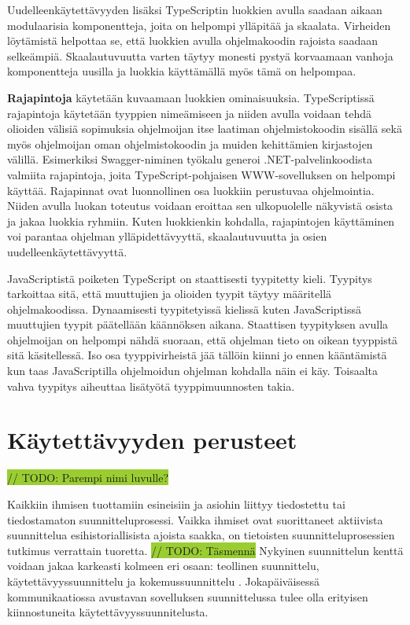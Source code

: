 \documentclass[utf8]{gradu3}
\begin{document}
Uudelleenkäytettävyyden lisäksi TypeScriptin luokkien avulla saadaan aikaan modulaarisia komponentteja, joita on helpompi ylläpitää ja skaalata. Virheiden löytämistä helpottaa se, että luokkien avulla ohjelmakoodin rajoista saadaan selkeämpiä. Skaalautuvuutta varten täytyy monesti pystyä korvaamaan vanhoja komponentteja uusilla ja luokkia käyttämällä myös tämä on helpompaa.

\textbf{Rajapintoja} käytetään kuvaamaan luokkien ominaisuuksia. TypeScriptissä rajapintoja käytetään tyyppien nimeämiseen ja niiden avulla voidaan tehdä olioiden välisiä sopimuksia ohjelmoijan itse laatiman ohjelmistokoodin sisällä sekä myös ohjelmoijan oman ohjelmistokoodin ja muiden kehittämien kirjastojen välillä. \parencite[]{typescript-interfaces} Esimerkiksi Swagger-niminen työkalu generoi .NET-palvelinkoodista valmiita rajapintoja, joita TypeScript-pohjaisen WWW-sovelluksen on helpompi käyttää. Rajapinnat ovat luonnollinen osa luokkiin perustuvaa ohjelmointia. Niiden avulla luokan toteutus voidaan eroittaa sen ulkopuolelle näkyvistä osista ja jakaa luokkia ryhmiin. Kuten luokkienkin kohdalla, rajapintojen käyttäminen voi parantaa ohjelman ylläpidettävyyttä, skaalautuvuutta ja osien uudelleenkäytettävyyttä.

JavaScriptistä poiketen TypeScript on staattisesti tyypitetty kieli. Tyypitys tarkoittaa sitä, että muuttujien ja olioiden tyypit täytyy määritellä ohjelmakoodissa. Dynaamisesti tyypitetyissä kielissä kuten JavaScriptissä muuttujien tyypit päätellään käännöksen aikana. Staattisen tyypityksen avulla ohjelmoijan on helpompi nähdä suoraan, että ohjelman tieto on oikean tyyppistä sitä käsitellessä. Iso osa tyyppivirheistä jää tällöin kiinni jo ennen kääntämistä kun taas JavaScriptilla ohjelmoidun ohjelman kohdalla näin ei käy. Toisaalta vahva tyypitys aiheuttaa lisätyötä tyyppimuunnosten takia.

\section{Käytettävyyden perusteet}
\colorbox{YellowGreen}{// TODO: Parempi nimi luvulle?}

Kaikkiin ihmisen tuottamiin esineisiin ja asiohin liittyy tiedostettu tai tiedostamaton suunnitteluprosessi. Vaikka ihmiset ovat suorittaneet aktiivista suunnittelua esihistoriallisista ajoista saakka, on tietoisten suunnitteluprosessien tutkimus verrattain tuoretta. \colorbox{YellowGreen}{// TODO: Täsmennä} Nykyinen suunnittelun kenttä voidaan jakaa karkeasti kolmeen eri osaan: teollinen suunnittelu, käytettävyyssuunnittelu ja kokemussuunnittelu \parencite[]{norman-doet}. Jokapäiväisessä kommunikaatiossa avustavan sovelluksen suunnittelussa tulee olla erityisen kiinnostuneita käytettävyyssuunnitelusta.
\end{document}
